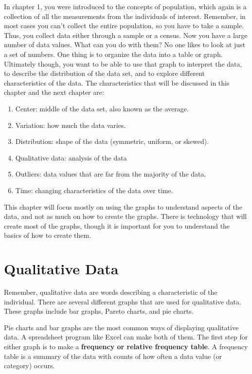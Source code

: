 \documentclass[]{book}
\begin{document}
In chapter 1, you were introduced to the concepts of population, which
again is a collection of all the measurements from the individuals of
interest. Remember, in most cases you can't collect the entire
population, so you have to take a sample. Thus, you collect data either
through a sample or a census. Now you have a large number of data
values. What can you do with them? No one likes to look at just a set of
numbers. One thing is to organize the data into a table or graph.
Ultimately though, you want to be able to use that graph to interpret
the data, to describe the distribution of the data set, and to explore
different characteristics of the data. The characteristics that will be
discussed in this chapter and the next chapter are:

\begin{enumerate}
\def\labelenumi{\arabic{enumi}.}
\item
  Center: middle of the data set, also known as the average.
\item
  Variation: how much the data varies.
\item
  Distribution: shape of the data (symmetric, uniform, or skewed).
\item
  Qualitative data: analysis of the data
\item
  Outliers: data values that are far from the majority of the data.
\item
  Time: changing characteristics of the data over time.
\end{enumerate}

This chapter will focus mostly on using the graphs to understand aspects
of the data, and not as much on how to create the graphs. There is
technology that will create most of the graphs, though it is important
for you to understand the basics of how to create them.

\hypertarget{qualitative-data}{%
\section{Qualitative Data}\label{qualitative-data}}

Remember, qualitative data are words describing a characteristic of the
individual. There are several different graphs that are used for
qualitative data. These graphs include bar graphs, Pareto charts, and
pie charts.

Pie charts and bar graphs are the most common ways of displaying
qualitative data. A spreadsheet program like Excel can make both of
them. The first step for either graph is to make a \textbf{frequency or
relative frequency table}. A frequency table is a summary of the data
with counts of how often a data value (or category) occurs.
\end{document}
